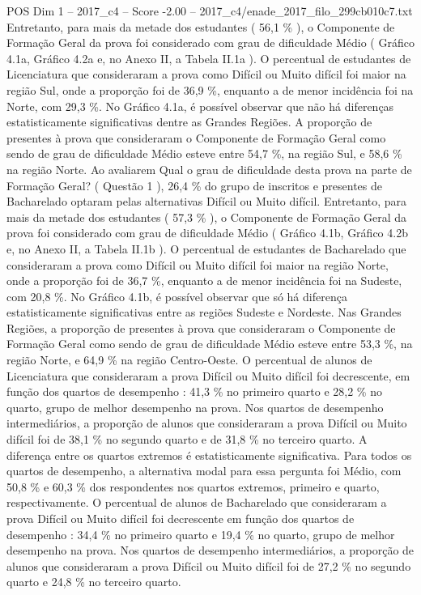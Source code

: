 \begin{textsample}{POS Dim 1 – 2017\_c4 – Score -2.00 – 2017\_c4/enade\_2017\_filo\_299cb010c7.txt}
Entretanto, para mais da metade dos estudantes ( 56,1 \% ), o Componente de Formação Geral da prova foi considerado com grau de dificuldade Médio ( Gráfico 4.1a, Gráfico 4.2a e, no Anexo II, a Tabela II.1a ).
O percentual de estudantes de Licenciatura que consideraram a prova como Difícil ou Muito difícil foi maior na região Sul, onde a proporção foi de 36,9 \%, enquanto a de menor incidência foi na Norte, com 29,3 \%.
No Gráfico 4.1a, é possível observar que não há diferenças estatisticamente significativas dentre as Grandes Regiões.
A proporção de presentes à prova que consideraram o Componente de Formação Geral como sendo de grau de dificuldade Médio esteve entre 54,7 \%, na região Sul, e 58,6 \% na região Norte.
Ao avaliarem Qual o grau de dificuldade desta prova na parte de Formação Geral? ( Questão 1 ), 26,4 \% do grupo de inscritos e presentes de Bacharelado optaram pelas alternativas Difícil ou Muito difícil.
Entretanto, para mais da metade dos estudantes ( 57,3 \% ), o Componente de Formação Geral da prova foi considerado com grau de dificuldade Médio ( Gráfico 4.1b, Gráfico 4.2b e, no Anexo II, a Tabela II.1b ).
O percentual de estudantes de Bacharelado que consideraram a prova como Difícil ou Muito difícil foi maior na região Norte, onde a proporção foi de 36,7 \%, enquanto a de menor incidência foi na Sudeste, com 20,8 \%.
No Gráfico 4.1b, é possível observar que só há diferença estatisticamente significativas entre as regiões Sudeste e Nordeste.
Nas Grandes Regiões, a proporção de presentes à prova que consideraram o Componente de Formação Geral como sendo de grau de dificuldade Médio esteve entre 53,3 \%, na região Norte, e 64,9 \% na região Centro-Oeste.
O percentual de alunos de Licenciatura que consideraram a prova Difícil ou Muito difícil foi decrescente, em função dos quartos de desempenho : 41,3 \% no primeiro quarto e 28,2 \% no quarto, grupo de melhor desempenho na prova.
Nos quartos de desempenho intermediários, a proporção de alunos que consideraram a prova Difícil ou Muito difícil foi de 38,1 \% no segundo quarto e de 31,8 \% no terceiro quarto.
A diferença entre os quartos extremos é estatisticamente significativa.
Para todos os quartos de desempenho, a alternativa modal para essa pergunta foi Médio, com 50,8 \% e 60,3 \% dos respondentes nos quartos extremos, primeiro e quarto, respectivamente.
O percentual de alunos de Bacharelado que consideraram a prova Difícil ou Muito difícil foi decrescente em função dos quartos de desempenho : 34,4 \% no primeiro quarto e 19,4 \% no quarto, grupo de melhor desempenho na prova.
Nos quartos de desempenho intermediários, a proporção de alunos que consideraram a prova Difícil ou Muito difícil foi de 27,2 \% no segundo quarto e 24,8 \% no terceiro quarto.

\end{textsample}
